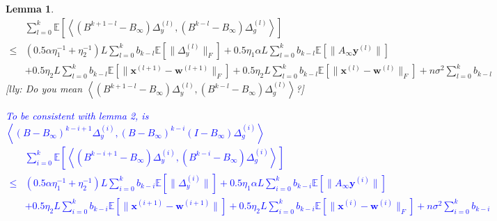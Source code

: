 \documentclass{article}
\newtheorem{lemma}[thm]{Lemma}
\newcommand{\vw}{{\mathbf{w}}}
\newcommand{\vx}{{\mathbf{x}}}
\newcommand{\vy}{{\mathbf{y}}}
\newcommand{\EE}[1]{\mathbb{E}\left[#1\right]}
\newcommand{\norm}[1]{\| #1 \|}
\newcommand{\ip}[1]{\left\langle#1\right\rangle}
\newcommand{\lly}[1]{{\color{red}[lly: #1]}}
\begin{document}
\begin{lemma}
\begin{align*}
  &\sum_{l=0}^k \EE{\ip{(B^{k+1-l}-B_{\infty})\Delta_y^{(l)},(B^{k-l}-B_{\infty})\Delta_g^{(l)}}} \\ 
  \leq& (0.5\alpha\eta_1^{-1}+\eta_2^{-1}) L \sum_{l=0}^k b_{k-l} \EE{\norm{\Delta_y^{(l)}}_F}+0.5\eta_1\alpha L\sum_{l=0}^k b_{k-l}\EE{\norm{A_{\infty}\vy^{(l)}}}\\&+0.5\eta_2 L\sum_{l=0}^k b_{k-l} \EE{\norm{\vx^{(l+1)}-\vw^{(l+1)}}_F}+0.5\eta_2 L\sum_{l=0}^k b_{k-l} \EE{\norm{\vx^{(l)}-\vw^{(l)}}_F}+n\sigma^2\sum_{l=0}^k b_{k-l}
\end{align*}
\lly{Do you mean $\ip{(B^{k+1-l}-B_{\infty})\Delta_y^{(l)},(B^{k-l}-B_{\infty})\Delta_g^{(l)}}$?}

\textcolor{blue}{To be consistent with lemma 2, is $\ip{(B-B_{\infty})^{k-i+1}\Delta_y^{(i)}, (B-B_{\infty})^{k-i}(I-B_{\infty})\Delta_g^{(i)}}$
\begin{align*}
  &\sum_{i=0}^k \EE{\ip{(B^{k-i+1}-B_{\infty})\Delta_y^{(i)},(B^{k-i}-B_{\infty})\Delta_g^{(i)}}} \\ 
  \leq& (0.5\alpha\eta_1^{-1}+\eta_2^{-1}) L \sum_{i=0}^k b_{k-i} \EE{\norm{\Delta_y^{(i)}}}+0.5\eta_1\alpha L\sum_{i=0}^k b_{k-i}\EE{\norm{A_{\infty}\vy^{(i)}}}\\&+0.5\eta_2 L\sum_{i=0}^k b_{k-i} \EE{\norm{\vx^{(i+1)}-\vw^{(i+1)}}}+0.5\eta_2 L\sum_{i=0}^k b_{k-i} \EE{\norm{\vx^{(i)}-\vw^{(i)}}_F}+n\sigma^2\sum_{i=0}^k b_{k-i}
\end{align*}}
\end{lemma}
\end{document}
